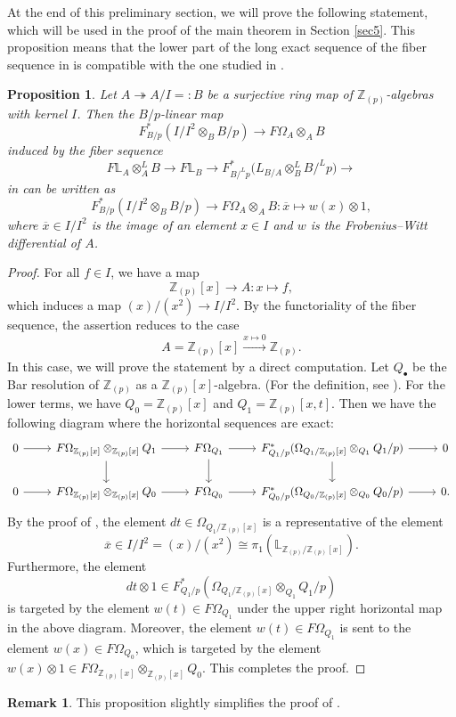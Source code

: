 \documentclass[11pt, a4paper]{amsart}
\theoremstyle{plain}
\newtheorem{prop}[theorem]{Proposition}
\theoremstyle{definition}
\newtheorem{remark}[theorem]{Remark}
\begin{document}
At the end of this preliminary section, we will prove the following statement, which will be used in the proof of the main theorem in Section \ref{sec5}. This proposition means that the lower part of the long exact sequence of the fiber sequence in \cite[Theorem 5.3]{Shi26} is compatible with the one studied in \cite[Proposition 2.3]{Sai22}. 
\begin{prop}\label{pro2.7}
    Let $A\twoheadrightarrow A/I=:B$ be a surjective ring map of $\mathbb Z_{(p)}$-algebras with kernel $I$. Then the $B/p$-linear map \[F_{B/p}^*(I/I^2\otimes_BB/p)\to F\Omega_A\otimes_AB\] induced by the fiber sequence\[F\mathbb L_A\otimes_A^LB\to F\mathbb L_B\to F_{B/^Lp}^*\mathbb (L_{B/A}\otimes_B^LB/^Lp)\to \] in \cite[Theorem 5.3]{Shi26} can be written as \[F_{B/p}^*(I/I^2\otimes_BB/p)\to F\Omega_A\otimes_AB:\overline x\mapsto w(x)\otimes 1,\] where $\overline x\in I/I^2$ is the image of an element $x\in I$ and $w$ is the Frobenius--Witt differential of $A$.
\end{prop}
\begin{proof}
    For all $f\in I$, we have a map \[\mathbb Z_{(p)}[x]\to A:x\mapsto f,\] which induces a map $(x)/(x^2)\to I/I^2$. By the functoriality of the fiber sequence, the assertion reduces to the case \[A=\mathbb Z_{(p)}[x]\xrightarrow[]{x\mapsto 0}\mathbb Z_{(p)}.\] In this case, we will prove the statement by a direct computation. Let $Q_{\bullet}$ be the Bar resolution of $\mathbb Z_{(p)}$ as a $\mathbb Z_{(p)}[x]$-algebra. (For the definition, see \cite[Construction 4.13]{Iye07}). For the lower terms, we have $Q_0=\mathbb Z_{(p)}[x]$ and $Q_1=\mathbb Z_{(p)}[x,t]$.  Then we have the following diagram where the  horizontal sequences are exact:
    \[
\begin{tikzcd}
  0 \ar[r] & F\Omega_{\mathbb Z_{(p)}[x]}\otimes_{\mathbb Z_{(p)}[x]}Q_1 \ar[r] & F\Omega_{Q_1} \ar[r] & F^*_{Q_1/p}(\Omega_{Q_1/\mathbb Z_{(p)}[x]}\otimes_{Q_1}Q_1/p) \ar[r] & 0 \\
  0 \ar[r] & F\Omega_{\mathbb Z_{(p)}[x]}\otimes_{\mathbb Z_{(p)}[x]}Q_0 \ar[r] & F\Omega_{Q_0} \ar[r] & F^*_{Q_0/p}(\Omega_{Q_0/\mathbb Z_{(p)}[x]}\otimes_{Q_0}Q_0/p) \ar[r] & 0.
  \ar[from=1-2, to=2-2] %
  \ar[from=1-3, to=2-3] %
  \ar[from=1-4, to=2-4] %
\end{tikzcd}
\]
By the proof of \cite[Claim 3.30]{Bha12}, the element $dt\in \Omega_{Q_1/\mathbb Z_{(p)}[x]}$ is a representative of the element \[\overline x\in I/I^2=(x)/(x^2)\cong \pi_1(\mathbb L_{\mathbb Z_{(p)}/\mathbb Z_{(p)}[x]}).\] Furthermore, the element \[dt\otimes 1\in F^*_{Q_1/p}(\Omega_{Q_1/\mathbb Z_{(p)}[x]}\otimes_{Q_1}Q_1/p)\] is targeted by the element $w(t)\in F\Omega_{Q_1}$ under the upper right horizontal map in the above diagram. Moreover, the element $w(t)\in F\Omega_{Q_1}$ is sent to the element $w(x)\in F\Omega_{Q_0}$, which is targeted by the element $w(x)\otimes 1\in F\Omega_{\mathbb Z_{(p)}[x]}\otimes _{\mathbb Z_{(p)}[x]}Q_0$. This completes the proof.
\end{proof}
\begin{remark}
    This proposition slightly simplifies the proof of \cite[Corollary 6.2]{Shi26}.
\end{remark}
\end{document}
